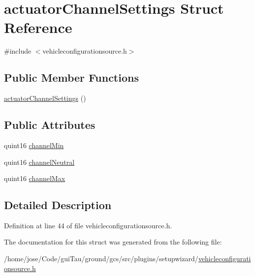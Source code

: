 \hypertarget{structactuator_channel_settings}{\section{actuator\-Channel\-Settings Struct Reference}
\label{structactuator_channel_settings}
}


{\ttfamily \#include $<$vehicleconfigurationsource.\-h$>$}

\subsection*{Public Member Functions}
\begin{DoxyCompactItemize}
\item 
\hyperlink{group___vehicle_configuration_source_gafb0dd689dc5216c230c118b385dc1b56}{actuator\-Channel\-Settings} ()
\end{DoxyCompactItemize}
\subsection*{Public Attributes}
\begin{DoxyCompactItemize}
\item 
quint16 \hyperlink{group___vehicle_configuration_source_ga51bfc85e00becd45e4e622da70ff9d27}{channel\-Min}
\item 
quint16 \hyperlink{group___vehicle_configuration_source_gac557d0adca6e1ec8f789659c32cfbeff}{channel\-Neutral}
\item 
quint16 \hyperlink{group___vehicle_configuration_source_ga204a4e4648453d51e42ad2b82cb68fa8}{channel\-Max}
\end{DoxyCompactItemize}


\subsection{Detailed Description}


Definition at line 44 of file vehicleconfigurationsource.\-h.



The documentation for this struct was generated from the following file\-:\begin{DoxyCompactItemize}
\item 
/home/jose/\-Code/gui\-Tau/ground/gcs/src/plugins/setupwizard/\hyperlink{vehicleconfigurationsource_8h}{vehicleconfigurationsource.\-h}\end{DoxyCompactItemize}

